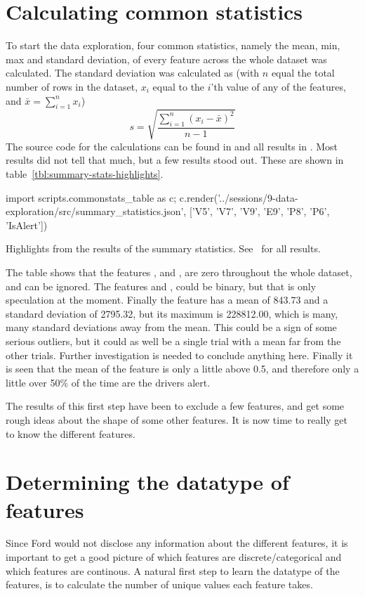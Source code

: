 \section{Calculating common statistics}\label{sec:summary-statistics}
To start the data exploration, four common statistics, namely the mean, min, max and standard deviation, of every feature across the whole dataset was calculated. The standard deviation was calculated as (with $n$ equal the total number of rows in the dataset, $x_i$ equal to the $i$'th value of any of the features, and $\bar{x}=\sum_{i=1}^n x_i$)
\[
    s = \sqrt{\frac{\sum_{i=1}^n (x_i-\bar{x})^2}{n-1}}
\]
The source code for the calculations can be found in  and all results in . Most results did not tell that much, but a few results stood out. These are shown in table~\ref{tbl:summary-stats-highlights}.
\begin{table}
    {\small\sffamily
        \begin{python}
            import scripts.commonstats_table as c; c.render('../sessions/9-data-exploration/src/summary_statistics.json', ['V5', 'V7', 'V9', 'E9', 'P8', 'P6', 'IsAlert'])
        \end{python}
    }
    \caption{Highlights from the results of the summary statistics. See~ for all results.}
    \label{tbl:summary-stats-highlights}
\end{table}
The table shows that the features ,  and , are zero throughout the whole dataset, and can be ignored. The features  and , could be binary, but that is only speculation at the moment. Finally the feature  has a mean of 843.73 and a standard deviation of 2795.32, but its maximum is 228812.00, which is many, many standard deviations away from the mean. This could be a sign of some serious outliers, but it could as well be a single trial with a mean far from the other trials. Further investigation is needed to conclude anything here. Finally it is seen that the mean of the  feature is only a little above 0.5, and therefore only a little over 50\% of the time are the drivers alert.\par
The results of this first step have been to exclude a few features, and get some rough ideas about the shape of some other features. It is now time to really get to know the different features.

\section{Determining the datatype of features}
Since Ford would not disclose any information about the different features, it is important to get a good picture of which features are discrete/categorical and which features are continous. A natural first step to learn the datatype of the features, is to calculate the number of unique values each feature takes.
